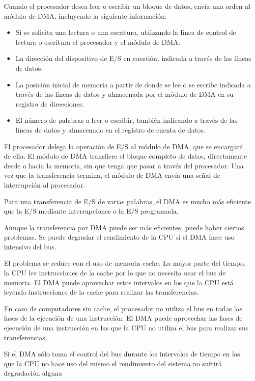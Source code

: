 Cuando el procesador desea leer o escribir un bloque de datos, envía una orden al módulo de DMA, incluyendo la siguiente información:

\begin{itemize}
  \item Si se solicita una lectura o una escritura, utilizando la línea de control de lectura o escritura el procesador y el módulo de DMA.\@
  \item La dirección del dispositivo de E/S en cuestión, indicada a través de las líneas de datos.
  \item La posición inicial de memoria a partir de donde se lee o se escribe indicada a través de las líneas de datos y almacenada por el módulo de DMA en su registro de direcciones.
  \item El número de palabras a leer o escribir, también indicando a través de las líneas de datos y almacenado en el registro de cuenta de datos.
\end{itemize}

El procesador delega la operación de E/S al módulo de DMA, que se encargará de ella. El módulo de DMA transfiere el bloque completo de datos, directamente desde o hacia la memoria, sin que tenga que pasar a través del procesador. Una vez que la transferencia termina, el módulo de DMA envía una señal de interrupción al procesador.

Para una transferencia de E/S de varias palabras, el DMA es mucho más eficiente que la E/S mediante interrupciones o la E/S programada.

Aunque la transferencia por DMA puede ser más eficientes, puede haber ciertos problemas. Se puede degradar el rendimiento de la CPU si el DMA hace uso intensivo del bus.

El problema se reduce con el uso de memoria cache. La mayor parte del tiempo, la CPU lee instrucciones de la cache por lo que no necesita usar el bus de memoria. El DMA puede aprovechar estos intervalos en los que la CPU está leyendo instrucciones de la cache para realizar las transferencias.

En caso de computadores sin cache, el procesador no utiliza el bus en todas las fases de la ejecución de una instrucción. El DMA puede aprovechar las fases de ejecución de una instrucción en las que la CPU no utiliza el bus para realizar sus transferencias.

Si el DMA sólo toma el control del bus durante los intervalos de tiempo en los que la CPU no hace uso del mismo el rendimiento del sistema no sufrirá degradación alguna

